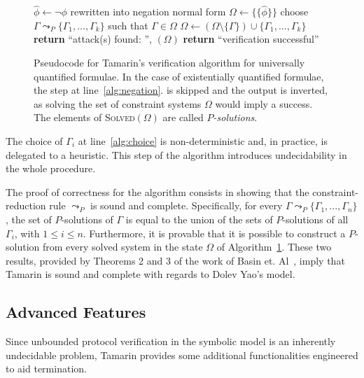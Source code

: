 \begin{figure}
    \centering
    \begin{minipage}{0.81\textwidth}
    \begin{algorithmic}[1]
        \State $\hat{\phi} \gets \neg \phi$ rewritten into negation normal form\label{alg:negation}
        \State $\Omega \gets \{\{\hat{\phi}\}\}$
            \State choose $\Gamma \leadsto_P \{\Gamma_1, \ldots, \Gamma_k\}$ such that $\Gamma \in \Omega$\label{alg:choice}
            \State $\Omega \gets (\Omega \setminus \{\Gamma\}) \cup \{\Gamma_1, \ldots, \Gamma_k\}$
        \EndWhile
            \State \textbf{return} ``attack(s) found: '', $(\Omega)$
        \Else
            \State \textbf{return} ``verification successful''
        \EndIf
        \EndFunction
    \end{algorithmic}
    \end{minipage}
    \caption{Pseudocode for Tamarin's verification algorithm for universally quantified formulae. In the case of existentially quantified formulae, the step at line~\ref{alg:negation}. is skipped and the output is inverted, as solving the set of constraint systems $\Omega$ would imply a success. The elements of \textsc{Solved}$(\Omega)$ are called \textit{$P$-solutions}.}
    \label{fig:tamarinalgorithm}
\end{figure}

The choice of $\Gamma_i$ at line~\ref{alg:choice} is non-deterministic and, in practice, is delegated to a heuristic. This step of the algorithm introduces undecidability in the whole procedure.

The proof of correctness for the algorithm consists in showing that the constraint-reduction rule $\leadsto_P$ is sound and complete. Specifically, for every $\Gamma \leadsto_P \{\Gamma_1, ..., \Gamma_n \}$, the set of $P$-solutions of $\Gamma$ is equal to the union of the sets of $P$-solutions of all $\Gamma_i$, with $1 \leq i \leq n$. Furthermore, it is provable that it is possible to construct a $P$-solution from every solved system in the state $\Omega$ of Algorithm~\ref{fig:tamarinalgorithm}. These two results, provided by Theorems 2 and 3 of the work of Basin et. Al~\cite{TamarinFoundations}, imply that Tamarin is sound and complete with regards to Dolev Yao's model. 

\subsection{Advanced Features}
\label{sec:advancedfeatures}
Since unbounded protocol verification in the symbolic model is an inherently undecidable problem, Tamarin provides some additional functionalities engineered to aid termination.

